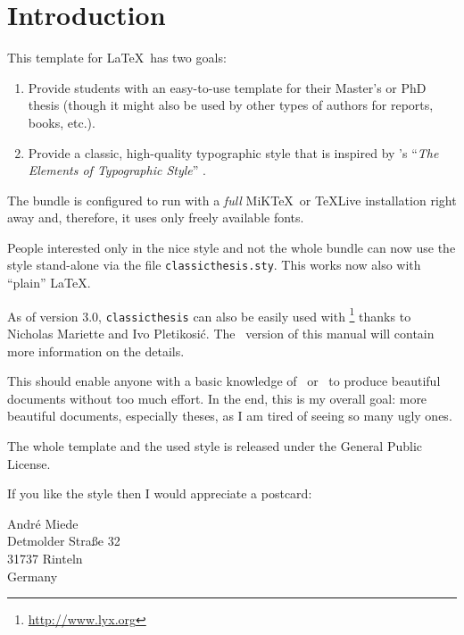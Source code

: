 
\chapter{Introduction} %

\label{ch:introduction} %


This template for \LaTeX\ has two goals:
\begin{enumerate}
\item Provide students with an easy-to-use template for their Master's or PhD thesis (though it might also be used by other types of authors for reports, books, etc.).
\item Provide a classic, high-quality typographic style that is inspired by \citeauthor{bringhurst:2002}'s ``\emph{The Elements of Typographic Style}'' \citep{bringhurst:2002}.
\marginpar{\myTitle \myVersion}
\end{enumerate}

The bundle is configured to run with a \emph{full} MiK\TeX\ or \TeX Live installation right away and, therefore, it uses only freely available fonts.

People interested only in the nice style and not the whole bundle can now use the style stand-alone via the file \texttt{classicthesis.sty}. This works now also with ``plain'' \LaTeX.

As of version 3.0, \texttt{classicthesis} can also be easily used with \mLyX\footnote{\url{http://www.lyx.org}} thanks to Nicholas Mariette and Ivo Pletikosi\'c. The \mLyX\ version of this manual will contain more information on the details.

This should enable anyone with a basic knowledge of \LaTeXe\ or \mLyX\ to produce beautiful documents without too much effort. In the end, this is my overall goal: more beautiful documents, especially theses, as I am tired of seeing so many ugly ones.

The whole template and the used style is released under the  General Public License. 

If you like the style then I would appreciate a postcard:
\begin{center}
André Miede \\
Detmolder Straße 32 \\
31737 Rinteln \\
Germany
\end{center}

